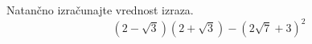 \documentclass[addpoints]{exam}
\begin{document}
\begin{questions}

    
    
















    \question[3]
    Natančno izračunajte vrednost izraza.
    $$ \left(2-\sqrt{3}\right)\left(2+\sqrt{3}\right)-\left(2\sqrt{7}+3\right)^2 $$


\end{questions}
\end{document}
